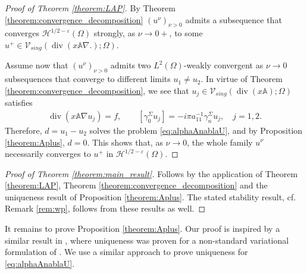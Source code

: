\documentclass[report]{elsarticle}
\numberwithin{theorem}{section}
\newcommand{\re}{\varepsilon}
\begin{document}
\begin{proof}[Proof of Theorem \ref{theorem:LAP}]
	By Theorem \ref{theorem:convergence_decomposition} $(u^{\nu})_{\nu>0}$ admits a subsequence that converges $\mathcal{H}^{1/2-\re}(\Omega)$ strongly, as $\nu\rightarrow 0+$, to some $u^+\in \mathcal{V}_{sing}(\operatorname{div}(x\mathbb{A}\nabla.); \Omega)$.  
	
	Assume now that $(u^{\nu})_{\nu>0}$ admits two  $L^2(\Omega)$-weakly convergent as $\nu\rightarrow 0$ subsequences that converge to different limits $u_1\neq u_2$. In virtue of Theorem \ref{theorem:convergence_decomposition}, we see that $u_j\in \mathcal{V}_{sing}(\operatorname{div}(x\mathbb{A}); \Omega)$ satisfies 
	\begin{align*}
		\operatorname{div}(x\mathbb{A}\nabla u_j)=f, \qquad [\gamma_0^{\Sigma}u_j]=-i\pi a_{11}^{-1}\gamma_n^{\Sigma}u_j,\quad j=1,2.
	\end{align*}
	Therefore, $d=u_1-u_2$ solves the problem \eqref{eq:alphaAnablaU}, and by Proposition \ref{theorem:Aplus}, $d=0$.  This shows that, as $\nu\rightarrow 0$, the whole family $u^{\nu}$ necessarily converges to $u^+$ in $\mathcal{H}^{1/2-\re}(\Omega)$.
\end{proof}
\begin{proof}[Proof of Theorem \ref{theorem:main_result}]
	Follows by the application of Theorem \ref{theorem:LAP},  Theorem \ref{theorem:convergence_decomposition} and the uniqueness result of Proposition \ref{theorem:Aplus}. The stated stability result, cf. Remark \ref{rem:wp}, follows from these results as well. 
\end{proof}
It remains to prove Proposition \ref{theorem:Aplus}. 
%
Our proof is inspired by a similar result in \cite{ciarlet_mk_peillon}, where uniqueness was proven for a non-standard variational formulation of \cite{nicolopoulos}. We use a similar approach to prove uniqueness for \eqref{eq:alphaAnablaU}. 
\end{document}
